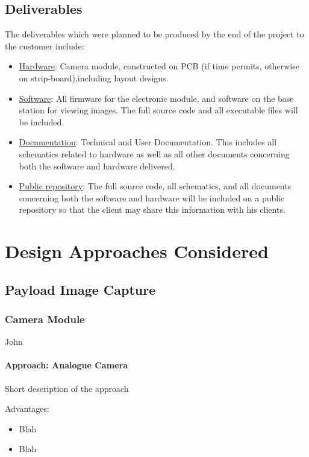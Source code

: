 \documentclass[oneside]{ecsgdp}         %
\begin{document}
\section{Deliverables}
The deliverables which were planned to be produced by the end of the project to the customer include:
\begin{itemize}
	\item \underline{Hardware}: Camera module, constructed on PCB (if time permits, otherwise on strip-board),including layout designs.
	\item \underline{Software}: All firmware for the electronic module, and software on the base station for viewing images. The full source code and all executable files will be included.
	\item \underline{Documentation}: Technical and User Documentation. This includes all schematics related to hardware as well as all other documents concerning both the software and hardware delivered.
	\item \underline{Public repository}: The full source code, all schematics, and all documents concerning both the software and hardware will be included on a public repository so that the client may share this information with his clients.
\end{itemize}

\chapter{Design Approaches Considered}

\section{Payload Image Capture}

\subsection{Camera Module}
John

\subsubsection{Approach: Analogue Camera}
Short description of the approach

Advantages:
\begin{itemize}
\item Blah
\item Blah
\end{itemize}
\end{document}
